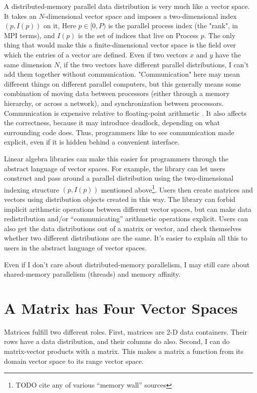 A distributed-memory parallel data distribution is very much like a vector
space. It takes an $N$-dimensional vector space and imposes a two-dimensional
index $(p,I(p))$ on it, Here $p \in [0,P)$ is the parallel process index (the
"rank", in MPI terms), and $I(p)$ is the set of indices that live on Process
$p$. The only thing that would make this a finite-dimensional vector space is
the field over which the entries of a vector are defined. Even if two vectors
$x$ and $y$ have the same dimension $N$, if the two vectors have different
parallel distributions, I can't add them together without communication.
"Communication" here may mean different things on different parallel computers,
but this generally means some combination of moving data between processors
(either through a memory hierarchy, or across a network), and synchronization
between processors. Communication is expensive relative to floating-point
arithmetic \cite{Blackford1997}. It also affects the correctness, because it may
introduce deadlock, depending on what surrounding code does. Thus, programmers
like to see communication made explicit, even if it is hidden behind a
convenient interface.


Linear algebra libraries can make this easier for programmers through the
abstract language of vector spaces.  For example, the library can let users
construct and pass around a parallel distribution using the two-dimensional
indexing structure $(p, I(p))$ mentioned above\footnote{ TODO cite any of
various “memory wall” sources}.  Users then create
matrices and vectors using distribution objects created in this way.  The
library can forbid implicit arithmetic operations between different vector
spaces, but can make data redistribution and/or “communicating” arithmetic
operations explicit.  Users can also get the data distributions out of a matrix
or vector, and check themselves whether two different distributions are the
same.  It’s easier to explain all this to users in the abstract language of
vector spaces.

Even if I don’t care about distributed-memory parallelism, I may still care
about shared-memory parallelism (threads) and memory affinity.

\section{A Matrix has Four Vector Spaces}

Matrices fulfill two different roles.  First, matrices are 2-D data containers.
Their rows have a data distribution, and their columns do also.  Second, I can
do matrix-vector products with a matrix.  This makes a matrix a function from
its domain vector space to its range vector space.
